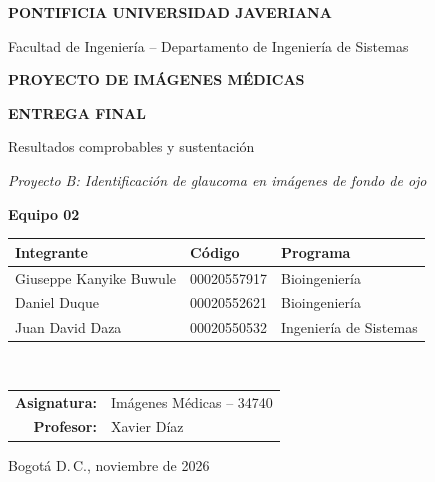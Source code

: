 \documentclass[pdflatex,sn-mathphys-num]{sn-jnl}%
\theoremstyle{thmstyleone}%
\theoremstyle{thmstyletwo}%
\theoremstyle{thmstylethree}%
\begin{document}
\renewcommand{\tablename}{Tabla}
\renewcommand{\figurename}{Figura}
\renewcommand{\refname}{Referencias}
\renewcommand{\appendixname}{Anexo}
\renewcommand{\contentsname}{Contenido}
\renewcommand{\abstractname}{Resumen}
\makeatletter\renewcommand{\keywordname}{Palabras clave}\makeatother

\begin{titlepage}
\centering
{\large\textbf{PONTIFICIA UNIVERSIDAD JAVERIANA}\par}
\vspace{0.3cm}
{Facultad de Ingeniería -- Departamento de Ingeniería de Sistemas\par}
\vspace{2.5cm}
{\Large\textbf{PROYECTO DE IMÁGENES MÉDICAS}\par}
\vspace{0.4cm}
{\Large\textbf{ENTREGA FINAL}\par}
\vspace{0.4cm}
{\large Resultados comprobables y sustentación\par}
\vspace{1.2cm}
{\large\textit{Proyecto B: Identificación de glaucoma en imágenes de fondo de ojo}\par}
\vspace{0.6cm}
{\large\textbf{Equipo 02}\par}
\vspace{2cm}
\begin{tabular}{lll}
\toprule
\textbf{Integrante} & \textbf{Código} & \textbf{Programa}\\
\midrule
Giuseppe Kanyike Buwule & 00020557917 & Bioingeniería\\
Daniel Duque            & 00020552621 & Bioingeniería\\
Juan David Daza         & 00020550532 & Ingeniería de Sistemas\\
\bottomrule
\end{tabular}\\[0.8cm]
\begin{tabular}{rl}
\textbf{Asignatura:} & Imágenes Médicas -- 34740\\
\textbf{Profesor:}   & Xavier Díaz\\
\end{tabular}
\vfill
{Bogotá D.\,C., noviembre de 2026\par}
\end{titlepage}
\end{document}
